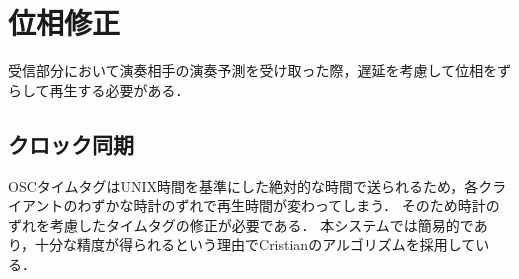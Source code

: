 \section{位相修正}
受信部分において演奏相手の演奏予測を受け取った際，遅延を考慮して位相をずらして再生する必要がある．

\subsection{クロック同期}
OSCタイムタグはUNIX時間を基準にした絶対的な時間で送られるため，各クライアントのわずかな時計のずれで再生時間が変わってしまう．
そのため時計のずれを考慮したタイムタグの修正が必要である．
本システムでは簡易的であり，十分な精度が得られるという理由でCristianのアルゴリズム\cite{cristian}を採用している．



